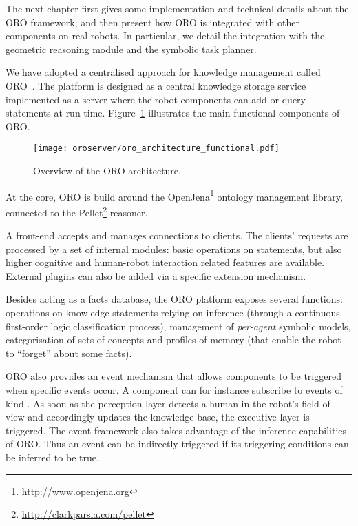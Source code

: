 The next chapter first gives some implementation and technical details about
the ORO framework, and then present how ORO is integrated with other components
on real robots. In particular, we detail the integration with the geometric
reasoning module and the symbolic task planner.



We have adopted a centralised approach for knowledge management called
ORO~\cite{Lemaignan2010}. The platform is designed as a central
knowledge storage service implemented as a server where the robot
components can add or query statements at run-time. Figure~\ref{fig|oro-overview}
illustrates the main functional components of ORO.

\begin{figure}
\centering
  \texttt{[image: oroserver/oro\_architecture\_functional.pdf]}
  \caption{Overview of the ORO architecture.}
  \label{fig|oro-overview}
\end{figure}

At the core, ORO is build around the
OpenJena\footnote{\url{http://www.openjena.org}} ontology management library,
connected to the Pellet\footnote{\url{http://clarkparsia.com/pellet}}
reasoner.

A front-end accepts and manages connections to clients. The clients' requests
are processed by a set of internal modules: basic operations on statements, but
also higher cognitive and human-robot interaction related features are
available. External plugins can also be added via a specific extension
mechanism.

Besides acting as a facts database, the ORO platform exposes several
functions: operations on knowledge statements relying on inference (through a
continuous first-order logic classification process), management of
\emph{per-agent} symbolic models, categorisation of sets of concepts
and profiles of memory (that enable the robot to ``forget'' about some facts).

ORO also provides an event mechanism that allows components to be triggered
when specific events occur. A component can for instance subscribe to events
of kind . As soon as the
perception layer detects a human in the robot's field of view and accordingly
updates the knowledge base, the executive layer is triggered. The event
framework also takes advantage of the inference capabilities of ORO. Thus an
event can be indirectly triggered if its triggering conditions can be
inferred to be true.

